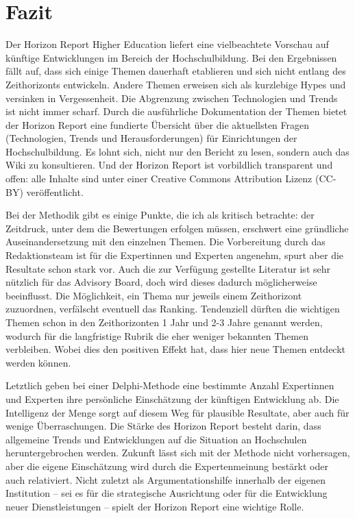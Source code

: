 \documentclass[a4paper,
fontsize=11pt,
oneside,
numbers=noperiodatend,
parskip=half-,
bibliography=totoc,
final
]{scrartcl}
\begin{document}
\section*{Fazit}\label{fazit}

Der Horizon Report Higher Education liefert eine vielbeachtete Vorschau
auf künftige Entwicklungen im Bereich der Hochschulbildung. Bei den
Ergebnissen fällt auf, dass sich einige Themen dauerhaft etablieren und
sich nicht entlang des Zeithorizonts entwickeln. Andere Themen erweisen
sich als kurzlebige Hypes und versinken in Vergessenheit. Die Abgrenzung
zwischen Technologien und Trends ist nicht immer scharf. Durch die
ausführliche Dokumentation der Themen bietet der Horizon Report eine
fundierte Übersicht über die aktuellsten Fragen (Technologien, Trends
und Herausforderungen) für Einrichtungen der Hochschulbildung. Es lohnt
sich, nicht nur den Bericht zu lesen, sondern auch das Wiki zu
konsultieren. Und der Horizon Report ist vorbildlich transparent und
offen: alle Inhalte sind unter einer Creative Commons Attribution Lizenz
(CC-BY) veröffentlicht.

Bei der Methodik gibt es einige Punkte, die ich als kritisch betrachte:
der Zeitdruck, unter dem die Bewertungen erfolgen müssen, erschwert eine
gründliche Auseinandersetzung mit den einzelnen Themen. Die Vorbereitung
durch das Redaktionsteam ist für die Expertinnen und Experten angenehm,
spurt aber die Resultate schon stark vor. Auch die zur Verfügung
gestellte Literatur ist sehr nützlich für das Advisory Board, doch wird
dieses dadurch möglicherweise beeinflusst. Die Möglichkeit, ein Thema
nur jeweils einem Zeithorizont zuzuordnen, verfälscht eventuell das
Ranking. Tendenziell dürften die wichtigen Themen schon in den
Zeithorizonten 1 Jahr und 2-3 Jahre genannt werden, wodurch für die
langfristige Rubrik die eher weniger bekannten Themen verbleiben. Wobei
dies den positiven Effekt hat, dass hier neue Themen entdeckt werden
können.

Letztlich geben bei einer Delphi-Methode eine bestimmte Anzahl
Expertinnen und Experten ihre persönliche Einschätzung der künftigen
Entwicklung ab. Die Intelligenz der Menge sorgt auf diesem Weg für
plausible Resultate, aber auch für wenige Überraschungen. Die Stärke des
Horizon Report besteht darin, dass allgemeine Trends und Entwicklungen
auf die Situation an Hochschulen heruntergebrochen werden. Zukunft lässt
sich mit der Methode nicht vorhersagen, aber die eigene Einschätzung
wird durch die Expertenmeinung bestärkt oder auch relativiert. Nicht
zuletzt als Argumentationshilfe innerhalb der eigenen Institution -- sei
es für die strategische Ausrichtung oder für die Entwicklung neuer
Dienstleistungen -- spielt der Horizon Report eine wichtige Rolle.
\end{document}

